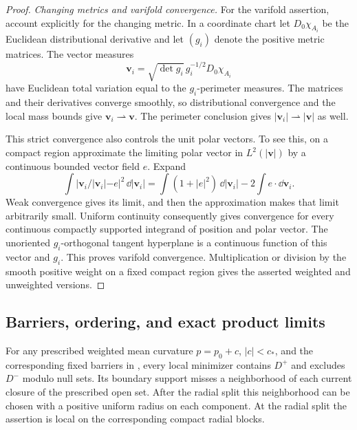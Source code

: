 \begin{proof}
\emph{Changing metrics and varifold convergence.}
For the varifold assertion, account explicitly for the changing metric.
In a coordinate chart let $D_0\chi_{A_i}$ be the
Euclidean distributional derivative and let $(g_i)$ denote the positive
metric matrices.  The vector measures
\[
      \mathbf v_i=\sqrt{\det g_i}\,g_i^{-1/2}D_0\chi_{A_i}
\]
have Euclidean total variation equal to the $g_i$-perimeter measures.
The matrices and their derivatives converge smoothly, so distributional
convergence and the local mass bounds give $\mathbf v_i\rightharpoonup
\mathbf v$.  The perimeter conclusion gives
$|\mathbf v_i|\rightharpoonup|\mathbf v|$ as well.

This strict convergence also controls the unit polar vectors.  To see
this, on a compact region approximate the limiting polar vector in
$L^2(|\mathbf v|)$ by a continuous bounded vector field $e$.
Expand
\[
 \int|\mathbf v_i/|\mathbf v_i|-e|^2\,\dd|\mathbf v_i|
 =\int(1+|e|^2)\,\dd|\mathbf v_i|-2\int e\cdot\dd\mathbf v_i.
\]
Weak convergence gives its limit, and then the approximation makes that
limit arbitrarily small.  Uniform continuity consequently gives
convergence for every continuous compactly supported integrand of
position and polar vector.  The unoriented $g_i$-orthogonal tangent
hyperplane is a continuous function of this vector and $g_i$.
This proves varifold convergence.  Multiplication or division by the
smooth positive weight on a fixed compact region gives the asserted
weighted and unweighted versions.
\end{proof}

\subsection{Barriers, ordering, and exact product limits}

\begin{lemma}\label{cut:barriers}
For any prescribed weighted mean curvature $p=p_0+c$, $|c|<c_*$, and the corresponding fixed
barriers in , every local minimizer contains
$D^+$ and excludes $D^-$ modulo null sets. Its boundary support misses
a neighborhood of each current closure of the prescribed open set.
After the radial split this neighborhood can be chosen with a positive
uniform radius on each component.  At the radial split the assertion is
local on the corresponding compact radial blocks.
\end{lemma}

